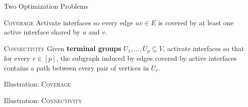 \documentclass[aspectratio=169]{beamer}
\newcommand{\coverage}{\textsc{Coverage}\xspace}
\newcommand{\connectivity}{\textsc{Connectivity}\xspace}
\begin{document}
\begin{frame}{Two Optimization Problems}
  \begin{block}{\coverage}
    Activate interfaces so every edge $uv \in E$ is covered by at least one active interface shared by $u$ and $v$.
  \end{block}

  \pause
  \begin{block}{\connectivity}
    Given \textbf{terminal groups} $U_1,\ldots,U_p\subseteq V$, activate interfaces so that for every $r\in[p]$, the subgraph induced by edges covered by active interfaces contains a path between every pair of vertices in $U_r$.
  \end{block}
\end{frame}

\begin{frame}{Illustration: \coverage}
  \centering
  
\end{frame}

\begin{frame}{Illustration: \connectivity}
  \centering
  
\end{frame}

\end{document}
